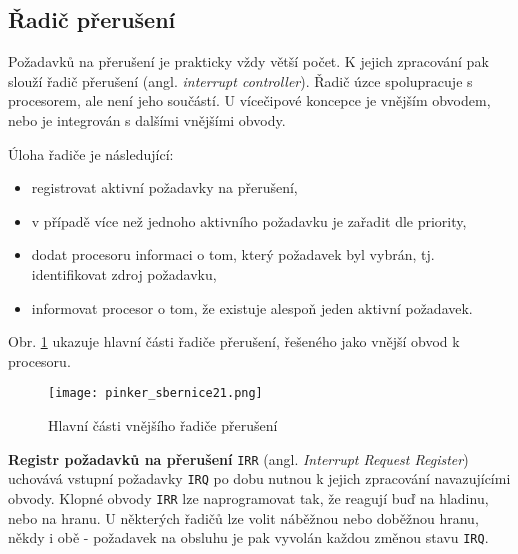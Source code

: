     \subsection{Řadič přerušení}
      Požadavků na přerušení je prakticky vždy větší počet. K jejich zpracování pak slouží řadič 
      přerušení (angl. \emph{interrupt controller}). Řadič úzce spolupracuje s procesorem, ale není 
      jeho součástí. U vícečipové koncepce je vnějším obvodem, nebo je integrován s dalšími 
      vnějšími obvody.
      
      Úloha řadiče je následující:
      \begin{itemize}\addtolength{\itemsep}{-0.5\baselineskip}
        \item registrovat aktivní požadavky na přerušení,
        \item v případě více než jednoho aktivního požadavku je zařadit dle priority,
        \item dodat procesoru informaci o tom, který požadavek byl vybrán, tj. identifikovat 
              zdroj požadavku,
        \item informovat procesor o tom, že existuje alespoň jeden aktivní požadavek.
      \end{itemize}
    
      Obr. \ref{MIT:fig_sbernice21} ukazuje hlavní části řadiče přerušení, řešeného jako vnější 
      obvod k procesoru.

      \begin{figure}[ht!] %
        \centering
        \texttt{[image: pinker\_sbernice21.png]}
        \caption{Hlavní části vnějšího řadiče přerušení}
        \label{MIT:fig_sbernice21}
      \end{figure}
      
      \textbf{Registr požadavků na přerušení} \texttt{IRR} (angl. \emph{Interrupt Request 
      Register}) uchovává vstupní požadavky \texttt{IRQ} po dobu nutnou k jejich zpracování 
      navazujícími obvody. Klopné obvody \texttt{IRR} lze naprogramovat tak, že reagují buď na 
      hladinu, nebo na hranu. U některých řadičů lze volit náběžnou nebo doběžnou hranu, někdy i 
      obě - požadavek na obsluhu je pak vyvolán každou změnou 
      stavu \texttt{IRQ}.
      
